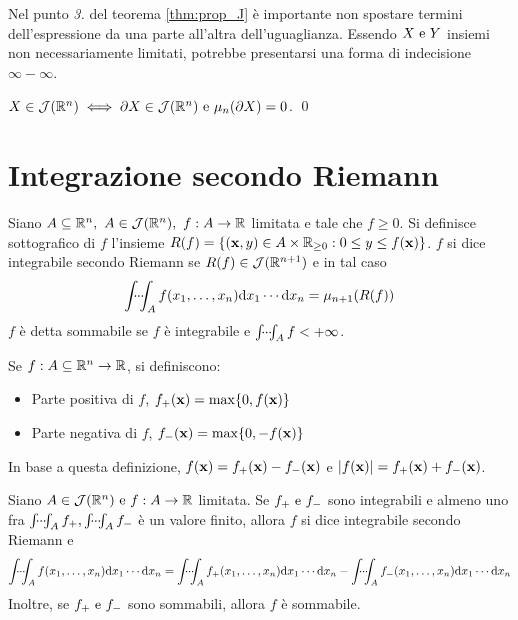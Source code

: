 \begin{remark}
    Nel punto \textit{3.} del teorema \ref{thm:prop_J} è importante non spostare termini dell'espressione da una parte all'altra dell'uguaglianza. Essendo $X \text{ e } Y$ insiemi non necessariamente limitati, potrebbe presentarsi una forma di indecisione $\infty - \infty$.
\end{remark}

\begin{lemma}
    $X \in \mathcal{J}(\mathbb{R}^n) \iff \partial X \in \mathcal{J}(\mathbb{R}^n) \text{ e } \mu_n(\partial X)=0$.
    \qed
\end{lemma}

\section{Integrazione secondo Riemann}

\begin{definition}
    Siano $A \subseteq \mathbb{R}^n, \ A \in \mathcal{J}(\mathbb{R}^n), \ f: A \to \mathbb{R}$ limitata e tale che $f \geq 0$. Si definisce sottografico di $f$ l'insieme $R(f)=\{(\vb{x}, y)\in A \times \mathbb{R}_{\geq 0} : 0 \leq y \leq f(\vb{x})\}$.
    $f$ si dice integrabile secondo Riemann se $R(f) \in \mathcal{J}(\mathbb{R}^{n+1})$ e in tal caso
    $$
        \idotsint_A f(x_1,\dots,x_n)\dd x_1\cdots \dd x_n=\mu_{n+1}(R(f))
    $$
    $f$ è detta sommabile se $f$ è integrabile e $\idotsint_Af < +\infty$.
\end{definition}

\begin{definition}
    \label{def:ppos_pneg}
    Se $f:A \subseteq \mathbb{R}^n \to \mathbb{R}$, si definiscono:
    \begin{itemize}
        \item Parte positiva di $f$, $f_+(\vb{x})=\max\{0,f(\vb{x})\}$
        \item Parte negativa di $f$, $f_-(\vb{x})=\max\{0,-f(\vb{x})\}$
    \end{itemize}
    In base a questa definizione, $f(\vb{x})=f_+(\vb{x})-f_-(\vb{x})$ e $\abs{f(\vb{x})}=f_+(\vb{x})+f_-(\vb{x})$.
\end{definition}

\begin{definition}
    Siano $A \in \mathcal{J}(\mathbb{R}^n) \text{ e } f: A \to \mathbb{R}$ limitata. Se $f_+ \text{ e } f_-$ sono integrabili e almeno uno fra $\idotsint_A f_+, \idotsint_A f_-$ è un valore finito, allora $f$ si dice integrabile secondo Riemann e
    $$
        \idotsint_Af(x_1,\dots,x_n)\dd x_1\cdots \dd x_n = \idotsint_A f_+(x_1,\dots,x_n)\dd x_1\cdots \dd x_n - \idotsint_A f_-(x_1,\dots,x_n)\dd x_1\cdots \dd x_n
    $$
    Inoltre, se $f_+ \text{ e } f_-$ sono sommabili, allora $f$ è sommabile.
\end{definition}

